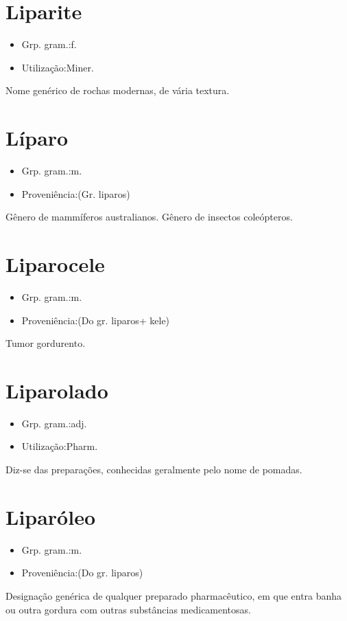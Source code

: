 \section{Liparite}
\begin{itemize}
\item {Grp. gram.:f.}
\end{itemize}
\begin{itemize}
\item {Utilização:Miner.}
\end{itemize}
Nome genérico de rochas modernas, de vária textura.
\section{Líparo}
\begin{itemize}
\item {Grp. gram.:m.}
\end{itemize}
\begin{itemize}
\item {Proveniência:(Gr. \textunderscore liparos\textunderscore )}
\end{itemize}
Gênero de mammíferos australianos.
Gênero de insectos coleópteros.
\section{Liparocele}
\begin{itemize}
\item {Grp. gram.:m.}
\end{itemize}
\begin{itemize}
\item {Proveniência:(Do gr. \textunderscore liparos\textunderscore  + \textunderscore kele\textunderscore )}
\end{itemize}
Tumor gordurento.
\section{Liparolado}
\begin{itemize}
\item {Grp. gram.:adj.}
\end{itemize}
\begin{itemize}
\item {Utilização:Pharm.}
\end{itemize}
Diz-se das preparações, conhecidas geralmente pelo nome de pomadas.
\section{Liparóleo}
\begin{itemize}
\item {Grp. gram.:m.}
\end{itemize}
\begin{itemize}
\item {Proveniência:(Do gr. \textunderscore liparos\textunderscore )}
\end{itemize}
Designação genérica de qualquer preparado pharmacêutico, em que entra banha ou outra gordura com outras substâncias medicamentosas.
